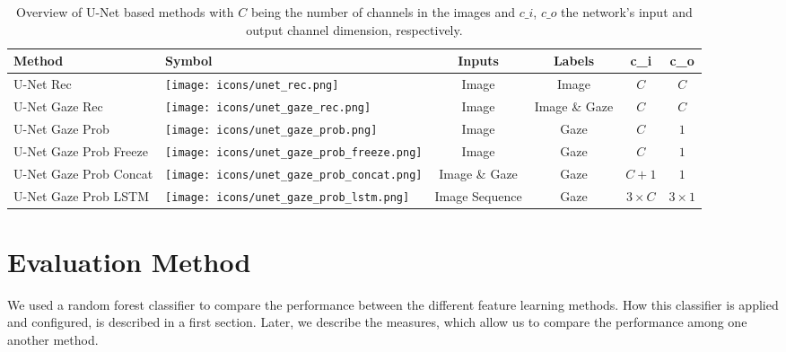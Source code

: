 \begin{table}[!htbp]
   \centering
   \caption[U-Net based method overview]{Overview of U-Net based methods with $C$ being the number of channels in the images and $c\_i$, $c\_o$ the network's input and output channel dimension, respectively.}
   \begin{tabular}{l|m{1.3cm}|c|c|c|c}
      \toprule
      \textbf{Method} & \textbf{Symbol} & \textbf{Inputs} & \textbf{Labels} & \textbf{c\_i} & \textbf{c\_o} \\
      \midrule
      U-Net Rec & \texttt{[image: icons/unet\_rec.png]} & Image & Image & $C$ & $C$ \\
      \midrule
      U-Net Gaze Rec & \texttt{[image: icons/unet\_gaze\_rec.png]} & Image & Image \& Gaze & $C$ & $C$ \\
      \midrule
      U-Net Gaze Prob & \texttt{[image: icons/unet\_gaze\_prob.png]} & Image & Gaze & $C$ & $1$ \\
      \midrule
      U-Net Gaze Prob Freeze & \texttt{[image: icons/unet\_gaze\_prob\_freeze.png]} & Image & Gaze & $C$ & $1$ \\
      \midrule
      U-Net Gaze Prob Concat & \texttt{[image: icons/unet\_gaze\_prob\_concat.png]} & Image \& Gaze & Gaze & $C+1$ & $1$ \\
       \midrule
      U-Net Gaze Prob LSTM & \texttt{[image: icons/unet\_gaze\_prob\_lstm.png]} & Image Sequence & Gaze & $3 \times C$ & $3 \times 1$ \\
      \bottomrule
   \end{tabular}
   \label{tab:summary_unet_methods}
\end{table}


\section{Evaluation Method}
We used a random forest classifier to compare the performance between the different feature learning methods. How this classifier is applied and configured, is described in a first section. Later, we describe the measures, which allow us to compare the performance among one another method.

